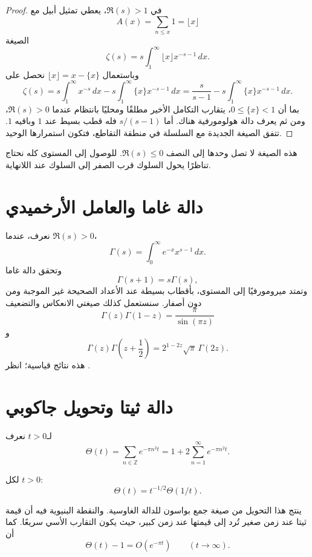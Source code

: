 \begin{proof}
في \(\Re(s)>1\)، يعطي تمثيل أبيل مع
\[
A(x)=\sum_{n\leq x}1=\lfloor x\rfloor
\]
الصيغة
\[
\zeta(s)
=
s\int_1^\infty \lfloor x\rfloor x^{-s-1}\,dx.
\]
وباستعمال \(\lfloor x\rfloor=x-\{x\}\) نحصل على
\[
\zeta(s)
=
s\int_1^\infty x^{-s}\,dx
-
s\int_1^\infty \{x\}x^{-s-1}\,dx
=
\frac{s}{s-1}
-
s\int_1^\infty \{x\}x^{-s-1}\,dx.
\]
بما أن \(0\leq\{x\}<1\)، يتقارب التكامل الأخير مطلقًا ومحليًا
بانتظام عندما \(\Re(s)>0\)، ومن ثم يعرف دالة هولومورفية هناك. أما
\(s/(s-1)\) فله قطب بسيط عند \(1\) وباقيه \(1\). تتفق الصيغة الجديدة
مع السلسلة في منطقة التقاطع، فتكون استمرارها الوحيد.
\end{proof}

\begin{remark}
هذه الصيغة لا تصل وحدها إلى النصف \(\Re(s)\leq0\). للوصول إلى المستوى
كله نحتاج تناظرًا يحول السلوك قرب الصفر إلى السلوك عند اللانهاية.
\end{remark}

\section{دالة غاما والعامل الأرخميدي}

نعرف، عندما \(\Re(s)>0\)،
\[
\Gamma(s)
=
\int_0^\infty e^{-x}x^{s-1}\,dx.
\]
وتحقق دالة غاما
\[
\Gamma(s+1)=s\Gamma(s),
\]
وتمتد ميرومورفيًا إلى المستوى، بأقطاب بسيطة عند الأعداد الصحيحة غير
الموجبة ومن دون أصفار. سنستعمل كذلك صيغتي الانعكاس والتضعيف
\[
\Gamma(z)\Gamma(1-z)
=
\frac{\pi}{\sin(\pi z)}
\]
و
\[
\Gamma(z)\Gamma\!\left(z+\frac12\right)
=
2^{1-2z}\sqrt{\pi}\,\Gamma(2z).
\]
هذه نتائج قياسية؛ انظر \cite{Apostol1976,Titchmarsh1986}.

\section{دالة ثيتا وتحويل جاكوبي}

لـ\(t>0\) نعرف
\[
\Theta(t)
=
\sum_{n\in\mathbb{Z}}e^{-\pi n^2t}
=
1+2\sum_{n=1}^{\infty}e^{-\pi n^2t}.
\]

\begin{theorem}
\label{thm:jacobi-theta-transformation}
لكل \(t>0\):
\[
\Theta(t)
=
t^{-1/2}\Theta(1/t).
\]
\end{theorem}

ينتج هذا التحويل من صيغة جمع بواسون للدالة الغاوسية. والنقطة البنيوية
فيه أن قيمة ثيتا عند زمن صغير تُرد إلى قيمتها عند زمن كبير، حيث يكون
التقارب الأسي سريعًا. كما أن
\[
\Theta(t)-1=O(e^{-\pi t})
\qquad(t\to\infty).
\]

